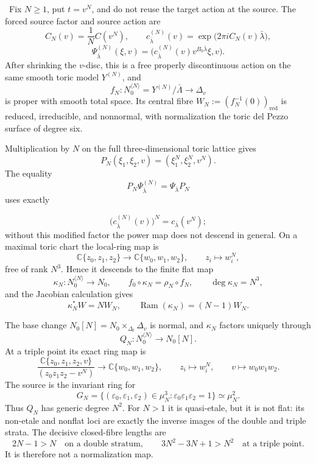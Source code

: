 \begin{auditrecord}
\Verified\ Fix \(N\geq1\), put \(t=v^N\), and do not reuse the target
action at the source.  The forced source factor and source action are
\[
 C_N(v)=\frac1N C(v^N),\qquad
 c^{(N)}_{\bar\lambda}(v)=
 \exp\bigl(2\pi iC_N(v)\bar\lambda\bigr),
\]
\[
 \Psi^{(N)}_{\bar\lambda}(\xi,v)=
 \bigl(c^{(N)}_{\bar\lambda}(v)
 v^{B_0\bar\lambda}\xi,v\bigr).
\]
After shrinking the \(v\)-disc, this is a free properly discontinuous
action on the same smooth toric model \(Y^{(N)}\), and
\[
 f_N:N_0^{\langle N\rangle}=Y^{(N)}/\bar\Lambda
 \longrightarrow\Delta_v
\]
 is proper with smooth total space.  Its central fibre
 \(W_N:=(f_N^{-1}(0))_{\mathrm{red}}\) is reduced,
irreducible, and nonnormal, with normalization the toric del Pezzo surface
of degree six.

Multiplication by \(N\) on the full three-dimensional toric lattice gives
\[
 P_N(\xi_1,\xi_2,v)=(\xi_1^N,\xi_2^N,v^N).
\]
The equality
\[
 P_N\Psi^{(N)}_{\bar\lambda}=\Psi_{\bar\lambda}P_N
\]
uses exactly

\[
 \bigl(c^{(N)}_{\bar\lambda}(v)\bigr)^N
 =c_{\bar\lambda}(v^N);
\]
without this modified factor the power map does not descend in general.
On a maximal toric chart the local-ring map is
\[
 \mathbb C\{z_0,z_1,z_2\}\longrightarrow
 \mathbb C\{w_0,w_1,w_2\},\qquad z_i\longmapsto w_i^N,
\]
free of rank \(N^3\).  Hence it descends to the finite flat map
\[
 \kappa_N:N_0^{\langle N\rangle}\longrightarrow N_0,\qquad
 f_0\circ\kappa_N=\rho_N\circ f_N,\qquad \deg\kappa_N=N^3,
\]
and the Jacobian calculation gives
\[
 \kappa_N^*W=NW_N,\qquad
 \operatorname{Ram}(\kappa_N)=(N-1)W_N.
\]

The base change \(N_0[N]=N_0\times_{\Delta_t}\Delta_v\) is normal, and
\(\kappa_N\) factors uniquely through
\[
 Q_N:N_0^{\langle N\rangle}\longrightarrow N_0[N].
\]
At a triple point its exact ring map is
\[
 \frac{\mathbb C\{z_0,z_1,z_2,v\}}
 {(z_0z_1z_2-v^N)}
 \longrightarrow\mathbb C\{w_0,w_1,w_2\},\qquad
 z_i\longmapsto w_i^N,\qquad v\longmapsto w_0w_1w_2.
\]
The source is the invariant ring for
\[
 G_N=\{(\varepsilon_0,\varepsilon_1,\varepsilon_2)\in\mu_N^3:
 \varepsilon_0\varepsilon_1\varepsilon_2=1\}\simeq\mu_N^2.
\]
Thus \(Q_N\) has generic degree \(N^2\).  For \(N>1\) it is quasi-etale,
but it is not flat: its non-etale and nonflat loci are exactly the inverse
images of the double and triple strata.  The decisive closed-fibre lengths
are
\[
 2N-1>N\quad\text{on a double stratum},
 \qquad
 3N^2-3N+1>N^2\quad\text{at a triple point}.
\]
It is therefore not a normalization map.


\end{auditrecord}
